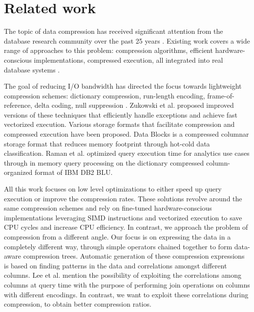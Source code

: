 
\chapter{Related work}
\label{ch:relatedwork}



\ifpdf
    \graphicspath{{7/figures/PNG/}{7/figures/PDF/}{7/figures/}}
\else
    \graphicspath{{7/figures/EPS/}{7/figures/}}
\fi


% 

The topic of data compression has received significant attention from the database research community over the past 25 years \cite{abadi2006integrating,zukowski2006super,lang2016data,polychroniou2015efficient,graefe1991data}. Existing work covers a wide range of approaches to this problem: compression algorithms, efficient hardware-conscious implementations, compressed execution, all integrated into real database systems \cite{kemper2011hyper,zukowski2012vectorwise}.

The goal of reducing I/O bandwidth has directed the focus towards lightweight compression schemes: dictionary compression, run-length encoding, frame-of-reference, delta coding, null suppression \cite{abadi2006integrating,goldstein1998compressing,lemire2015decoding,roth1993database,zukowski2006super}. Zukowski et al. \cite{zukowski2006super} proposed improved versions of these techniques that efficiently handle exceptions and achieve fast vectorized execution. Various storage formats that facilitate compression and compressed execution have been proposed. Data Blocks \cite{lang2016data} is a compressed columnar storage format that reduces memory footprint through hot-cold data classification. Raman et al. \cite{raman2013db2} optimized query execution time for analytics use cases through in memory query processing on the dictionary compressed column-organized format of IBM DB2 BLU.

All this work focuses on low level optimizations to either speed up query execution or improve the compression rates. These solutions revolve around the same compression schemes and rely on fine-tuned hardware-conscious implementations leveraging SIMD instructions and vectorized execution to save CPU cycles and increase CPU efficiency. In contrast, we approach the problem of compression from a different angle. Our focus is on expressing the data in a completely different way, through simple operators chained together to form data-aware compression trees. Automatic generation of these compression expressions is based on finding patterns in the data and correlations amongst different columns. Lee et al. \cite{lee2014joins} mention the possibility of exploiting the correlations among columns at query time with the purpose of performing join operations on columns with different encodings. In contrast, we want to exploit these correlations during compression, to obtain better compression ratios.

